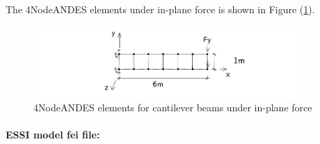 \documentclass[fleqn,11pt]{article}
\begin{document}
\begin{lstlisting}

\end{lstlisting}

The 4NodeANDES elements under in-plane force is shown in Figure (\ref{fig 4NodeANDES elements for cantilever beams under inplane force}).

\begin{figure}[!htb]
  \centering
  \vskip 8pt
    \centering
    \includegraphics[width=10cm]{../Figure-files/_Chapter_Appendix_Illustrative_Examples/beam_ANDES_yz_inPlane_6div.pdf}
  \caption{4NodeANDES elements for cantilever beams under in-plane force}
  \label{fig 4NodeANDES elements for cantilever beams under inplane force}
\end{figure}


\paragraph{ESSI model fei file: } ~
\end{document}
